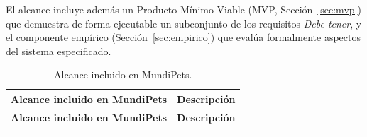 \documentclass[journal,onecolumn]{IEEEtran}
\begin{document}
	El alcance incluye además un Producto Mínimo Viable
	(MVP, Sección~\ref{sec:mvp}) que demuestra de forma ejecutable un subconjunto
	de los requisitos \emph{Debe tener}, y el componente empírico
	(Sección~\ref{sec:empirico}) que evalúa formalmente aspectos del sistema
	especificado.
	
	\begin{longtable}{|p{4cm}|p{11cm}|}
		\caption{Alcance incluido en MundiPets.} \label{tab:alcance_incluido} \\
		\hline
		\textbf{Alcance incluido en MundiPets} & \textbf{Descripción} \\
		\hline
		\endfirsthead
		\hline
		\textbf{Alcance incluido en MundiPets} & \textbf{Descripción} \\
		\hline
		\endhead
		\hline
		\endfoot
		\hline
		\endlastfoot
		

\end{longtable}
\end{document}
